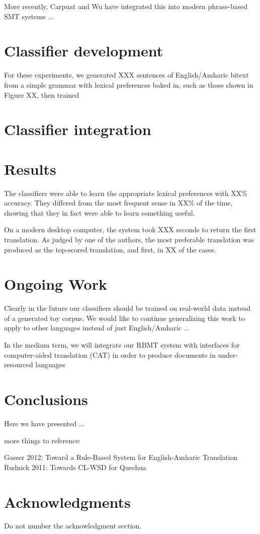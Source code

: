\documentclass[11pt]{article}
\begin{document}
More recently, Carpuat and Wu have integrated this into modern phrase-based SMT
systems ...  \cite{carpuatpsd} \cite{improvingsmtwsd}

\section{Classifier development}
For these experiments, we generated XXX sentences of English/Amharic bitext
from a simple grammar with lexical preferences baked in, such as those shown in
Figure XX, then trained 

\section{Classifier integration}

\section{Results}
The classifiers were able to learn the appropriate lexical preferences with
XX\% accuracy. They differed from the most frequent sense in XX\% of the time,
showing that they in fact were able to learn something useful.

On a modern desktop computer, the system took XXX seconds to return the first
translation. As judged by one of the authors, the most preferable translation
was produced as the top-scored translation, and first, in XX of the cases.

\section{Ongoing Work}
Clearly in the future our classifiers should be trained on real-world data
instead of a generated toy corpus. We would like to continue generalizing this
work to apply to other languages instead of just English/Amharic ...


In the medium term, we will integrate our RBMT system with interfaces for
computer-aided translation (CAT) in order to produce documents in
under-resourced languages 

\section{Conclusions}
Here we have presented  ...

more things to reference:

Gasser 2012: Toward a Rule-Based System for English-Amharic Translation
Rudnick 2011: Towards CL-WSD for Quechua

\section*{Acknowledgments}

Do not number the acknowledgment section.


{}
\end{document}
